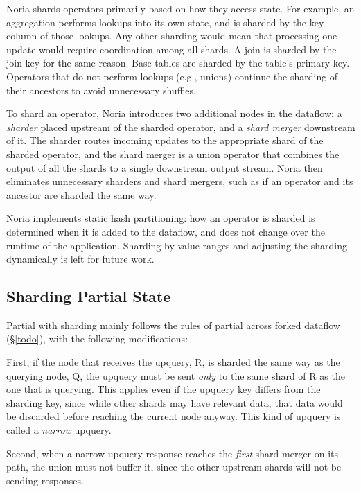 Noria shards operators primarily based on how they access state. For example, an
aggregation performs lookups into its own state, and is sharded by the key
column of those lookups. Any other sharding would mean that processing one
update would require coordination among all shards. A join is sharded by the
join key for the same reason. Base tables are sharded by the table's primary
key. Operators that do not perform lookups (e.g., unions) continue the sharding
of their ancestors to avoid unnecessary shuffles.

To shard an operator, Noria introduces two additional nodes in the dataflow: a
\emph{sharder} placed upstream of the sharded operator, and a \emph{shard
merger} downstream of it. The sharder routes incoming updates to the appropriate
shard of the sharded operator, and the shard merger is a union operator that
combines the output of all the shards to a single downstream output stream.
Noria then eliminates unnecessary sharders and shard mergers, such as if an
operator and its ancestor are sharded the same way.

Noria implements static hash partitioning: how an operator is sharded is
determined when it is added to the dataflow, and does not change over the
runtime of the application. Sharding by value ranges and adjusting the sharding
dynamically is left for future work.

\begin{comment}
  Sharding is tracked based on "ultimately source column". (column tracing)
\end{comment}

\subsection{Sharding Partial State}

Partial with sharding mainly follows the rules of partial across forked dataflow
(\S\ref{todo}), with the following modifications:

First, if the node that receives the upquery, R, is sharded the same way as the
querying node, Q, the upquery must be sent \emph{only} to the same shard of R as
the one that is querying. This applies even if the upquery key differs from the
sharding key, since while other shards may have relevant data, that data would
be discarded before reaching the current node anyway. This kind of upquery is
called a \emph{narrow} upquery.

Second, when a narrow upquery response reaches the \emph{first} shard merger on
its path, the union must not buffer it, since the other upstream shards will not
be sending responses.

